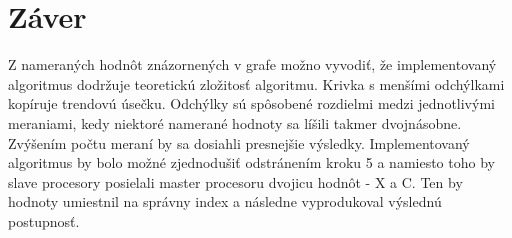 \documentclass[a4paper,11pt]{article}
\begin{document}
\section{Záver}
Z nameraných hodnôt znázornených v grafe možno vyvodiť, že implementovaný algoritmus dodržuje teoretickú zložitosť algoritmu. Krivka s menšími odchýlkami kopíruje trendovú úsečku. Odchýlky sú spôsobené rozdielmi medzi jednotlivými meraniami, kedy niektoré namerané hodnoty sa líšili takmer dvojnásobne. Zvýšením počtu meraní by sa dosiahli presnejšie výsledky.
Implementovaný algoritmus by bolo možné zjednodušiť odstránením kroku 5 a namiesto toho by slave procesory posielali master procesoru dvojicu hodnôt - X a C. Ten by hodnoty umiestnil na správny index a následne vyprodukoval výslednú postupnosť.
\end{document}
